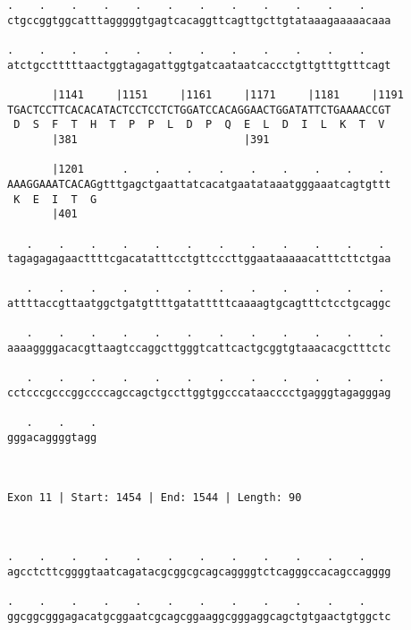\documentclass{article}
\begin{document}
\begin{Verbatim}
.    .    .    .    .    .    .    .    .    .    .    .    
ctgccggtggcatttagggggtgagtcacaggttcagttgcttgtataaagaaaaacaaa
                                                            
.    .    .    .    .    .    .    .    .    .    .    .    
atctgcctttttaactggtagagattggtgatcaataatcaccctgttgtttgtttcagt
                                                            
       |1141     |1151     |1161     |1171     |1181     |1191
TGACTCCTTCACACATACTCCTCCTCTGGATCCACAGGAACTGGATATTCTGAAAACCGT
 D  S  F  T  H  T  P  P  L  D  P  Q  E  L  D  I  L  K  T  V 
       |381                          |391                   
  
       |1201      .    .    .    .    .    .    .    .    . 
AAAGGAAATCACAGgtttgagctgaattatcacatgaatataaatgggaaatcagtgttt
 K  E  I  T  G                                              
       |401                                                 
  
   .    .    .    .    .    .    .    .    .    .    .    . 
tagagagagaacttttcgacatatttcctgttcccttggaataaaaacatttcttctgaa
                                                            
   .    .    .    .    .    .    .    .    .    .    .    . 
attttaccgttaatggctgatgttttgatatttttcaaaagtgcagtttctcctgcaggc
                                                            
   .    .    .    .    .    .    .    .    .    .    .    . 
aaaaggggacacgttaagtccaggcttgggtcattcactgcggtgtaaacacgctttctc
                                                            
   .    .    .    .    .    .    .    .    .    .    .    . 
cctcccgcccggccccagccagctgccttggtggcccataacccctgagggtagagggag
                                                            
   .    .    .
gggacaggggtagg
              
              
 
Exon 11 | Start: 1454 | End: 1544 | Length: 90



.    .    .    .    .    .    .    .    .    .    .    .    
agcctcttcggggtaatcagatacgcggcgcagcaggggtctcagggccacagccagggg
                                                            
.    .    .    .    .    .    .    .    .    .    .    .    
ggcggcgggagacatgcggaatcgcagcggaaggcgggaggcagctgtgaactgtggctc
                                                            

\end{Verbatim}
\end{document}
